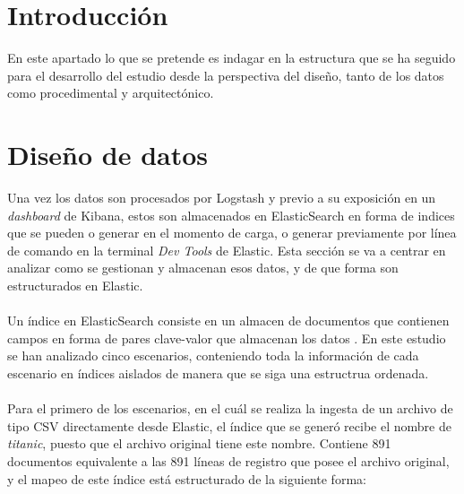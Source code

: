 
\section{Introducción}
En este apartado lo que se pretende es indagar en la estructura que se ha seguido para el desarrollo del estudio desde la perspectiva del diseño, tanto de los datos como procedimental y arquitectónico.

\section{Diseño de datos}
Una vez los datos son procesados por Logstash y previo a su exposición en un \textit{dashboard} de Kibana, estos son almacenados en ElasticSearch en forma de indices que se pueden o generar en el momento de carga, o generar previamente por línea de comando en la terminal \textit{Dev Tools} de Elastic. Esta sección se va a centrar en analizar como se gestionan y almacenan esos datos, y de que forma son estructurados en Elastic.

\paragraph{}

Un índice en ElasticSearch consiste en un almacen de documentos que contienen campos en forma de pares clave-valor que almacenan los datos \cite{indices}. En este estudio se han analizado cinco escenarios, conteniendo toda la información de cada escenario en índices aislados de manera que se siga una estructrua ordenada.

\paragraph{}
\paragraph{}
\paragraph{}


Para el primero de los escenarios, en el cuál se realiza la ingesta de un archivo de tipo CSV directamente desde Elastic, el índice que se generó recibe el nombre de \textit{titanic}, puesto que el archivo original tiene este nombre. Contiene 891 documentos equivalente a las 891 líneas de registro que posee el archivo original, y el mapeo de este índice está estructurado de la siguiente forma:

